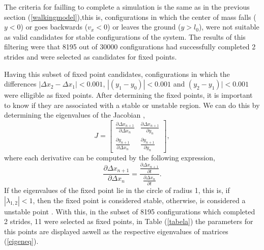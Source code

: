The criteria for failling to complete a simulation is the same as in the previous section (\ref{walkingmodel}),this is, configurations in which the center of mass falls ($y<0$) or goes backwards ($v_x<0$) or leaves the ground ($y>l_0$), were not suitable as valid candidates for stable configurations of the system. The results of this filtering were that 8195 out of 30000 configurations had successfully completed 2 strides and were selected as candidates for fixed points.

Having this subset of fixed point candidates, configurations in which the differences $|\Delta x_2-\Delta x_1|< 0.001$, $|(y_1-y_0)|<0.001$ and $(y_2-y_1)|<0.001$ were elligible as fixed points. After determining the fixed points, it is important to know if they are associated with a stable or unstable region. We can do this by determining the eigenvalues of the Jacobian \cite{Seyfarth2006},
\begin{equation}
 J= \begin{bmatrix}
    \frac{\partial \Delta x_{n+1}}{\partial \Delta x_{n}} & \frac{\partial \Delta x_{n+1}}{\partial  y_{n}}\\
     \frac{\partial  y_{n+1}}{\partial \Delta x_{n}} & \frac{\partial y_{n+1}}{\partial  y_{n}}
  \end{bmatrix},
  \label{eigeneq}
  \end{equation}
\noindent where each derivative can be computed by the following expression,
\begin{equation}
    \frac{\partial \Delta x_{n+1}}{\partial \Delta x_{n}}=  \frac{\frac{\partial \Delta x_{n+1}}{\partial t}}{\frac{\partial \Delta x_{n}}{\partial t}}. 
\end{equation}
If the eigenvalues of the fixed point lie in the circle of radius 1, this is, if $|\lambda_{1,2}|<1$, then the fixed point is considered stable, otherwise, is considered a unstable point \cite{Strogatz2001}. With this, in the subset of 8195 configurations which completed 2 strides, 11 were selected as fixed points, in Table (\ref{tabela}) the parameters for this points are displayed aswell as the respective eigenvalues of matrices (\ref{eigeneq}).

